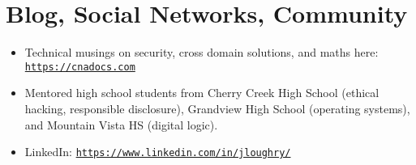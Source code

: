 \section*{Blog, Social Networks, Community}
\vspace{-2mm}

\begin{itemize}
    \item Technical musings on security, cross domain solutions, and maths
        here:
        \href{https://cnadocs.com}{\nolinkurl{https://cnadocs.com}}\vspace{-1mm}
    \item Mentored high school students from Cherry Creek High School
        (ethical hacking, responsible disclosure), Grandview High School
        (operating systems), and Mountain Vista HS (digital logic).\vspace{-1mm}
    \item LinkedIn:
        \href{https://www.linkedin.com/in/jloughry/}{\nolinkurl{https://www.linkedin.com/in/jloughry/}}
\end{itemize}

